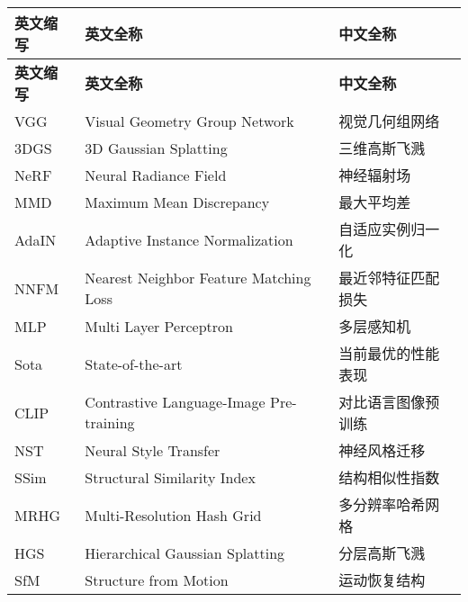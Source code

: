 \cleardoublepage
{}
\begin{center}
    \begin{longtable}{m{2cm}m{8cm}m{5cm}}
        \toprule
        \textbf{英文缩写}&\textbf{英文全称}&\textbf{中文全称}\\
        \midrule
        \endfirsthead
        \toprule
        \textbf{英文缩写}&\textbf{英文全称}&\textbf{中文全称}\\
        \midrule
        \endhead 
        \bottomrule
        \endfoot
        \bottomrule
        \endlastfoot
        VGG&Visual Geometry Group Network&视觉几何组网络\\
        3DGS&3D Gaussian Splatting&三维高斯飞溅\\
        NeRF&Neural Radiance Field&神经辐射场\\
        MMD&Maximum Mean Discrepancy&最大平均差\\
        AdaIN&Adaptive Instance Normalization&自适应实例归一化\\
        NNFM&Nearest Neighbor Feature Matching Loss&最近邻特征匹配损失\\
        MLP&Multi Layer Perceptron&多层感知机\\
        Sota&State-of-the-art&当前最优的性能表现\\
        CLIP&Contrastive Language-Image Pre-training&对比语言图像预训练\\
        NST&Neural Style Transfer&神经风格迁移\\
        SSim&Structural Similarity Index&结构相似性指数\\
        MRHG& Multi-Resolution Hash Grid & 多分辨率哈希网格\\
        HGS & Hierarchical Gaussian Splatting & 分层高斯飞溅\\
        SfM & Structure from Motion & 运动恢复结构\\
	\end{longtable}
\end{center}
